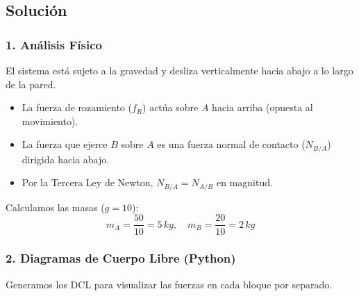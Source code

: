\documentclass[12pt, a4paper]{article}
\begin{document}
\begin{center}
\end{center}

\subsection*{Solución}

\subsubsection*{1. Análisis Físico}
El sistema está sujeto a la gravedad y desliza verticalmente hacia abajo a lo largo de la pared.
\begin{itemize}
    \item La fuerza de rozamiento ($f_R$) actúa sobre $A$ hacia arriba (opuesta al movimiento).
    \item La fuerza que ejerce $B$ sobre $A$ es una fuerza normal de contacto ($N_{B/A}$) dirigida hacia abajo.
    \item Por la Tercera Ley de Newton, $N_{B/A} = N_{A/B}$ en magnitud.
\end{itemize}

Calculamos las masas ($g=10$):
$$ m_A = \frac{50}{10} = 5 \, \si{kg}, \quad m_B = \frac{20}{10} = 2 \, \si{kg} $$

\subsubsection*{2. Diagramas de Cuerpo Libre (Python)}
Generamos los DCL para visualizar las fuerzas en cada bloque por separado.
\end{document}
